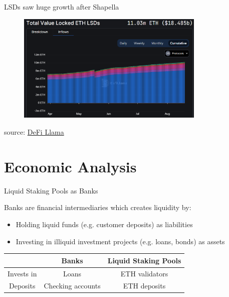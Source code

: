 \documentclass{beamer}
\begin{document}
\begin{frame}{LSDs saw huge growth after Shapella}
    \begin{figure}
        \centering
        \includegraphics[width=0.8\textwidth]{figures/lsd_2023.png}
    \end{figure}
    \tiny{source: \href{https://defillama.com/lsd}{DeFi Llama}}
    
\end{frame}

\section{Economic Analysis}
\begin{frame}{Liquid Staking Pools as Banks}

    \footnotemark Banks are financial intermediaries which creates liquidity by:

    \begin{itemize}
        \item Holding liquid funds (e.g. customer deposits) as liabilities
        \item Investing in illiquid investment projects (e.g. loans, bonds) as assets
    \end{itemize}

    \begin{tabular}{|c|c|c|}
        \hline
         & Banks & Liquid Staking Pools \\
        \hline
        Invests in & Loans & ETH validators \\
        \hline
        Deposits & Checking accounts & ETH deposits \\
        \hline
    \end{tabular}

\end{frame}
\end{document}
